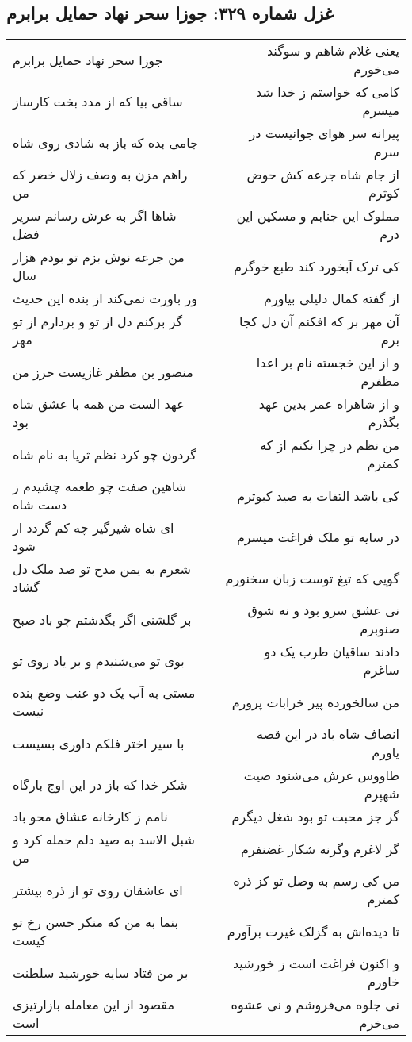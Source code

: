 \begin{center}
\section*{غزل شماره ۳۲۹: جوزا سحر نهاد حمایل برابرم}
\label{sec:sh329}
\begin{longtable}{l p{0.5cm} r}
جوزا سحر نهاد حمایل برابرم
&&
یعنی غلام شاهم و سوگند می‌خورم
\\
ساقی بیا که از مدد بخت کارساز
&&
کامی که خواستم ز خدا شد میسرم
\\
جامی بده که باز به شادی روی شاه
&&
پیرانه سر هوای جوانیست در سرم
\\
راهم مزن به وصف زلال خضر که من
&&
از جام شاه جرعه کش حوض کوثرم
\\
شاها اگر به عرش رسانم سریر فضل
&&
مملوک این جنابم و مسکین این درم
\\
من جرعه نوش بزم تو بودم هزار سال
&&
کی ترک آبخورد کند طبع خوگرم
\\
ور باورت نمی‌کند از بنده این حدیث
&&
از گفته کمال دلیلی بیاورم
\\
گر برکنم دل از تو و بردارم از تو مهر
&&
آن مهر بر که افکنم آن دل کجا برم
\\
منصور بن مظفر غازیست حرز من
&&
و از این خجسته نام بر اعدا مظفرم
\\
عهد الست من همه با عشق شاه بود
&&
و از شاهراه عمر بدین عهد بگذرم
\\
گردون چو کرد نظم ثریا به نام شاه
&&
من نظم در چرا نکنم از که کمترم
\\
شاهین صفت چو طعمه چشیدم ز دست شاه
&&
کی باشد التفات به صید کبوترم
\\
ای شاه شیرگیر چه کم گردد ار شود
&&
در سایه تو ملک فراغت میسرم
\\
شعرم به یمن مدح تو صد ملک دل گشاد
&&
گویی که تیغ توست زبان سخنورم
\\
بر گلشنی اگر بگذشتم چو باد صبح
&&
نی عشق سرو بود و نه شوق صنوبرم
\\
بوی تو می‌شنیدم و بر یاد روی تو
&&
دادند ساقیان طرب یک دو ساغرم
\\
مستی به آب یک دو عنب وضع بنده نیست
&&
من سالخورده پیر خرابات پرورم
\\
با سیر اختر فلکم داوری بسیست
&&
انصاف شاه باد در این قصه یاورم
\\
شکر خدا که باز در این اوج بارگاه
&&
طاووس عرش می‌شنود صیت شهپرم
\\
نامم ز کارخانه عشاق محو باد
&&
گر جز محبت تو بود شغل دیگرم
\\
شبل الاسد به صید دلم حمله کرد و من
&&
گر لاغرم وگرنه شکار غضنفرم
\\
ای عاشقان روی تو از ذره بیشتر
&&
من کی رسم به وصل تو کز ذره کمترم
\\
بنما به من که منکر حسن رخ تو کیست
&&
تا دیده‌اش به گزلک غیرت برآورم
\\
بر من فتاد سایه خورشید سلطنت
&&
و اکنون فراغت است ز خورشید خاورم
\\
مقصود از این معامله بازارتیزی است
&&
نی جلوه می‌فروشم و نی عشوه می‌خرم
\\
\end{longtable}
\end{center}
